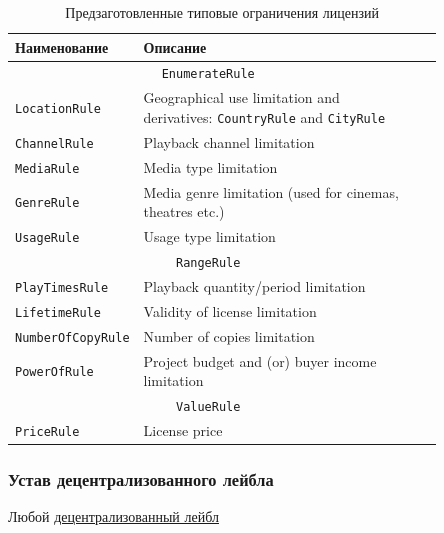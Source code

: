 \documentclass[12pt]{report}
\def\code#1{\colorbox{light-gray}{\texttt{#1}}}
\begin{document}
\begin{table}[h]
\centering
\caption{Предзаготовленные типовые ограничения лицензий}
\begin{tabular}{p{0.2\linewidth}p{0.65\linewidth}cc}
\toprule
Наименование & Описание \\
\bottomrule
\toprule
\multicolumn{2}{c}{\code{EnumerateRule}} \\
\midrule
	\code{LocationRule} & Geographical use limitation and derivatives: \code{CountryRule} and \code{CityRule} \\
	\code{ChannelRule} & Playback channel limitation \\
	\code{MediaRule} & Media type limitation \\
	\code{GenreRule} & Media genre limitation (used for cinemas, theatres etc.) \\
	\code{UsageRule} & Usage type limitation \\
\bottomrule
\toprule
\multicolumn{2}{c}{\code{RangeRule}} \\
\midrule
	\code{PlayTimesRule} & Playback quantity/period limitation \\
	\code{LifetimeRule} & Validity of license limitation \\
	\code{NumberOfCopyRule} & Number of copies limitation \\
	\code{PowerOfRule} & Project budget and (or) buyer income limitation \\
\bottomrule
\toprule
\multicolumn{2}{c}{\code{ValueRule}} \\
\midrule
	\code{PriceRule} & License price \\
\bottomrule
\end{tabular}
\end{table}

\subsubsection{Устав децентрализованного лейбла}
\label{tech-apps-dal-charter}
\begin{multicols}{2}
Любой \hyperref[tech-apps-dal]{децентрализованный лейбл} 
\end{multicols}
\end{document}
